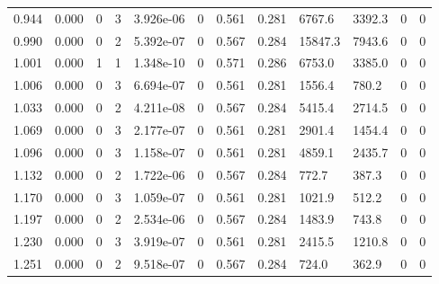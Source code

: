 \documentclass[preview]{standalone}
\begin{document}
{{\begin{tabular}{L{1.2cm}C{1.2cm} C{0.3cm}C{0.5cm} C{1.4cm}C{1.4cm} C{1.4cm}C{1.4cm} C{1.6cm}C{1.6cm} C{1.6cm}C{1.6cm}}
  0.944  &  0.000  & 0     &  3 &  3.926e-06  & 0  &  0.561&   0.281& 6767.6 & 3392.3   &  0 & 0  \\ 
  0.990  &  0.000  & 0     &  2 &  5.392e-07  & 0  &  0.567&   0.284& 15847.3 & 7943.6   &  0 & 0  \\ 
  1.001  &  0.000  & 1     &  1 &  1.348e-10  & 0  &  0.571&   0.286& 6753.0 & 3385.0   &  0 & 0  \\ 
  1.006  &  0.000  & 0     &  3 &  6.694e-07  & 0  &  0.561&   0.281& 1556.4 & 780.2   &  0 & 0  \\ 
  1.033  &  0.000  & 0     &  2 &  4.211e-08  & 0  &  0.567&   0.284& 5415.4 & 2714.5   &  0 & 0  \\ 
  1.069  &  0.000  & 0     &  3 &  2.177e-07  & 0  &  0.561&   0.281& 2901.4 & 1454.4   &  0 & 0  \\ 
  1.096  &  0.000  & 0     &  3 &  1.158e-07  & 0  &  0.561&   0.281& 4859.1 & 2435.7   &  0 & 0  \\ 
  1.132  &  0.000  & 0     &  2 &  1.722e-06  & 0  &  0.567&   0.284& 772.7 & 387.3   &  0 & 0  \\ 
  1.170  &  0.000  & 0     &  3 &  1.059e-07  & 0  &  0.561&   0.281& 1021.9 & 512.2   &  0 & 0  \\ 
  1.197  &  0.000  & 0     &  2 &  2.534e-06  & 0  &  0.567&   0.284& 1483.9 & 743.8   &  0 & 0  \\ 
  1.230  &  0.000  & 0     &  3 &  3.919e-07  & 0  &  0.561&   0.281& 2415.5 & 1210.8   &  0 & 0  \\ 
  1.251  &  0.000  & 0     &  2 &  9.518e-07  & 0  &  0.567&   0.284& 724.0 & 362.9   &  0 & 0  \\ 
\hline 
\end{tabular} 

}}
\end{document}
